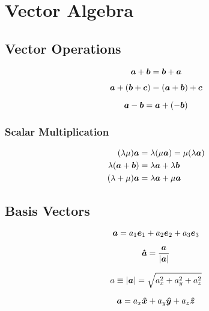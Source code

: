 \chapter{Vector Algebra}

\section{Vector Operations}

\begin{equation*}
    \boldsymbol{a}  + \boldsymbol{b} = \boldsymbol{b} + \boldsymbol{a}
\end{equation*}

\begin{equation*}
    \boldsymbol{a} + (\boldsymbol{b} + \boldsymbol{c}) = (\boldsymbol{a} + \boldsymbol{b}) + \boldsymbol{c}
\end{equation*}

\begin{equation*}
    \boldsymbol{a} -  \boldsymbol{b} =  \boldsymbol{a} +(- \boldsymbol{b})
\end{equation*}

\subsection*{Scalar Multiplication}

\begin{align*}
    (\lambda\mu)\boldsymbol{a} &= \lambda(\mu\boldsymbol{a}) = \mu(\lambda\boldsymbol{a})\\
    \lambda(\boldsymbol{a} +  \boldsymbol{b}) &= \lambda\boldsymbol{a} + \lambda\boldsymbol{b} \\
    (\lambda + \mu)\boldsymbol{a} &= \lambda\boldsymbol{a} + \mu\boldsymbol{a} 
\end{align*}

\section{Basis Vectors}

\begin{equation*}
    \boldsymbol{a} = a_1\boldsymbol{e}_1 + a_2\boldsymbol{e}_2 + a_3\boldsymbol{e}_3
\end{equation*}

\begin{equation*}
    \boldsymbol{\hat{a}} = \frac{\boldsymbol{a}}{|\boldsymbol{a}|}
\end{equation*}

\begin{equation*}
    a \equiv |\boldsymbol{a}| = \sqrt{a_x^2 + a_y^2 + a_z^2}
\end{equation*}

\begin{equation*}
    \boldsymbol{a} = a_x\boldsymbol{\hat{x}} + a_y\boldsymbol{\hat{y}} + a_z\boldsymbol{\hat{z}}
\end{equation*}

